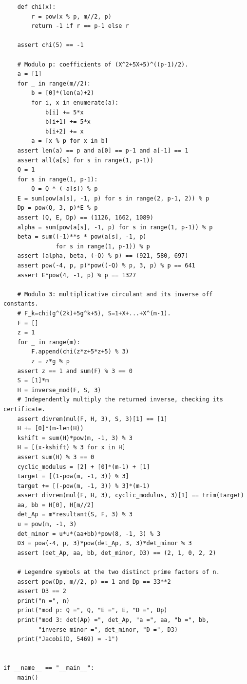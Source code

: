 \documentclass[11pt,a4paper]{article}
\theoremstyle{remark}
\begin{document}
\begin{lstlisting}
    def chi(x):
        r = pow(x % p, m//2, p)
        return -1 if r == p-1 else r

    assert chi(5) == -1

    # Modulo p: coefficients of (X^2+5X+5)^((p-1)/2).
    a = [1]
    for _ in range(m//2):
        b = [0]*(len(a)+2)
        for i, x in enumerate(a):
            b[i] += 5*x
            b[i+1] += 5*x
            b[i+2] += x
        a = [x % p for x in b]
    assert len(a) == p and a[0] == p-1 and a[-1] == 1
    assert all(a[s] for s in range(1, p-1))
    Q = 1
    for s in range(1, p-1):
        Q = Q * (-a[s]) % p
    E = sum(pow(a[s], -1, p) for s in range(2, p-1, 2)) % p
    Dp = pow(Q, 3, p)*E % p
    assert (Q, E, Dp) == (1126, 1662, 1089)
    alpha = sum(pow(a[s], -1, p) for s in range(1, p-1)) % p
    beta = sum((-1)**s * pow(a[s], -1, p)
               for s in range(1, p-1)) % p
    assert (alpha, beta, (-Q) % p) == (921, 580, 697)
    assert pow(-4, p, p)*pow((-Q) % p, 3, p) % p == 641
    assert E*pow(4, -1, p) % p == 1327

    # Modulo 3: multiplicative circulant and its inverse off constants.
    # F_k=chi(g^(2k)+5g^k+5), S=1+X+...+X^(m-1).
    F = []
    z = 1
    for _ in range(m):
        F.append(chi(z*z+5*z+5) % 3)
        z = z*g % p
    assert z == 1 and sum(F) % 3 == 0
    S = [1]*m
    H = inverse_mod(F, S, 3)
    # Independently multiply the returned inverse, checking its certificate.
    assert divrem(mul(F, H, 3), S, 3)[1] == [1]
    H += [0]*(m-len(H))
    kshift = sum(H)*pow(m, -1, 3) % 3
    H = [(x-kshift) % 3 for x in H]
    assert sum(H) % 3 == 0
    cyclic_modulus = [2] + [0]*(m-1) + [1]
    target = [(1-pow(m, -1, 3)) % 3]
    target += [(-pow(m, -1, 3)) % 3]*(m-1)
    assert divrem(mul(F, H, 3), cyclic_modulus, 3)[1] == trim(target)
    aa, bb = H[0], H[m//2]
    det_Ap = m*resultant(S, F, 3) % 3
    u = pow(m, -1, 3)
    det_minor = u*u*(aa+bb)*pow(8, -1, 3) % 3
    D3 = pow(-4, p, 3)*pow(det_Ap, 3, 3)*det_minor % 3
    assert (det_Ap, aa, bb, det_minor, D3) == (2, 1, 0, 2, 2)

    # Legendre symbols at the two distinct prime factors of n.
    assert pow(Dp, m//2, p) == 1 and Dp == 33**2
    assert D3 == 2
    print("n =", n)
    print("mod p: Q =", Q, "E =", E, "D =", Dp)
    print("mod 3: det(Ap) =", det_Ap, "a =", aa, "b =", bb,
          "inverse minor =", det_minor, "D =", D3)
    print("Jacobi(D, 5469) = -1")


if __name__ == "__main__":
    main()
\end{lstlisting}
\end{document}
